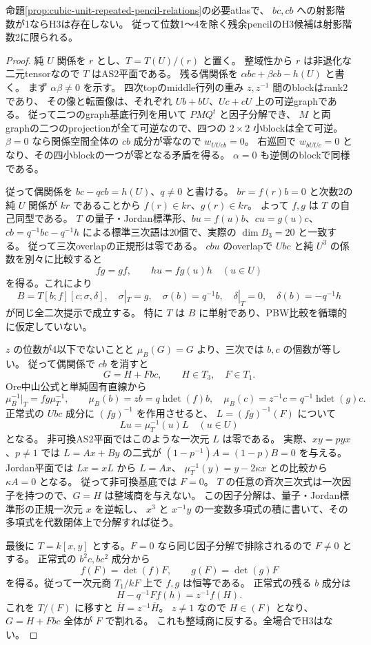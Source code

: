 \begin{theorem}
\label{thm:cubic-unit-pencil-even-rank1-empty}
命題\ref{prop:cubic-unit-repeated-pencil-relations}の必要atlasで、
$bc,cb$ への射影階数が1ならH3は存在しない。
従って位数1〜4を除く残余pencilのH3候補は射影階数2に限られる。
\end{theorem}
\begin{proof}
純 $U$ 関係を $r$ とし、$T=T(U)/(r)$ と置く。
整域性から $r$ は非退化な二元tensorなので $T$ はAS2平面である。
残る偶関係を $\alpha bc+\beta cb-h(U)$ と書く。
まず $\alpha\beta\ne0$ を示す。
四次topのmiddle行列の重み $z,z^{-1}$ 間のblockはrank2であり、
その像と転置像は、それぞれ $Ub+bU$、$Uc+cU$ 上の可逆graphである。
従って二つのgraph基底行列を用いて $P M Q^t$ と因子分解でき、
$M$ と両graphの二つのprojectionが全て可逆なので、四つの $2\times2$ 小blockは全て可逆。
$\beta=0$ なら関係空間全体の $cb$ 成分が零なので $w_{UUcb}=0$。
右巡回で $w_{bUUc}=0$ となり、その四小blockの一つが零となる矛盾を得る。
$\alpha=0$ も逆側のblockで同様である。

従って偶関係を $bc-qcb=h(U)$、$q\ne0$ と書ける。
$br=f(r)b=0$ と次数2の純 $U$ 関係が $kr$ であることから $f(r)\in kr$、$g(r)\in kr$。
よって $f,g$ は $T$ の自己同型である。
$T$ の量子・Jordan標準形、$bu=f(u)b$、$cu=g(u)c$、
$cb=q^{-1}bc-q^{-1}h$ による標準三次語は20個で、実際の $\dim B_3=20$ と一致する。
従って三次overlapの正規形は零である。
$cbu$ のoverlapで $Ubc$ と純 $U^3$ の係数を別々に比較すると
\[
 fg=gf,\qquad h u=fg(u)h\quad(u\in U)
\]
を得る。これにより
\[
 B=T[b;f][c;\sigma,\delta],\quad
 \sigma|_T=g,\quad\sigma(b)=q^{-1}b,\quad
 \delta|_T=0,\quad\delta(b)=-q^{-1}h
\]
が同じ全二次提示で成立する。
特に $T$ は $B$ に単射であり、PBW比較を循環的に仮定していない。

$z$ の位数が4以下でないことと $\mu_B(G)=G$ より、三次では $b,c$ の個数が等しい。
従って偶関係で $cb$ を消すと
\[
 G=H+Fbc,\qquad H\in T_3,\quad F\in T_1.
\]
Ore中山公式と単純固有直線から
\[
 \mu_B^{-1}|_T=fg\mu_T^{-1},\qquad
 \mu_B(b)=z b=q\operatorname{hdet}(f)b,\quad
 \mu_B(c)=z^{-1}c=q^{-1}\operatorname{hdet}(g)c.
\]
正常式の $Ubc$ 成分に $ (fg)^{-1}$ を作用させると、
$L=(fg)^{-1}(F)$ について
\[
 L u=\mu_T^{-1}(u)L\quad(u\in U)
\]
となる。
非可換AS2平面ではこのような一次元 $L$ は零である。
実際、$xy=p yx$、$p\ne1$ では $L=A x+B y$ の二式が
$(1-p^{-1})A=(1-p)B=0$ を与える。
Jordan平面では $Lx=xL$ から $L=A x$、
$\mu_T^{-1}(y)=y-2\kappa x$ との比較から $\kappa A=0$ となる。
従って非可換基底では $F=0$。
$T$ の任意の斉次三次式は一次因子を持つので、$G=H$ は整域商を与えない。
この因子分解は、量子・Jordan標準形の正規一次元 $x$ を逆転し、
$x^3$ と $x^{-1}y$ の一変数多項式の積に書いて、その多項式を代数閉体上で分解すれば従う。

最後に $T=k[x,y]$ とする。$F=0$ なら同じ因子分解で排除されるので $F\ne0$ とする。
正常式の $b^2c,bc^2$ 成分から
\[
 f(F)=\operatorname{det}(f)F,\qquad g(F)=\operatorname{det}(g)F
\]
を得る。従って一次元商 $T_1/kF$ 上で $f,g$ は恒等である。
正常式の残る $b$ 成分は
\[
 H-q^{-1}Ff(h)=z^{-1}f(H).
\]
これを $T/(F)$ に移すと $\overline H=z^{-1}\overline H$。
$z\ne1$ なので $H\in(F)$ となり、$G=H+Fbc$ 全体が $F$ で割れる。
これも整域商に反する。全場合でH3はない。
\end{proof}

